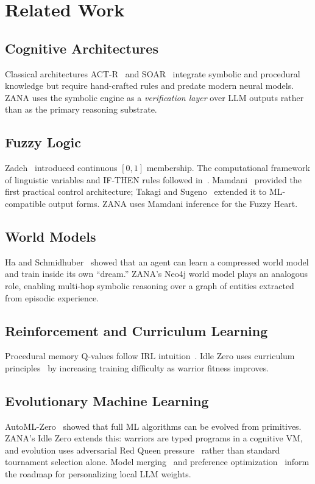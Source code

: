 \documentclass[12pt,a4paper]{article}
\begin{document}
\section{Related Work}

\subsection{Cognitive Architectures}
Classical architectures ACT-R~\cite{anderson2004actr} and SOAR~\cite{laird2012soar} integrate
symbolic and procedural knowledge but require hand-crafted rules and predate modern neural models.
ZANA uses the symbolic engine as a \emph{verification layer} over LLM outputs rather than as the
primary reasoning substrate.

\subsection{Fuzzy Logic}
Zadeh~\cite{zadeh1965fuzzysets} introduced continuous $[0,1]$ membership. The computational framework
of linguistic variables and IF-THEN rules followed in~\cite{zadeh1973outline,zadeh1975fuzzylogic}.
Mamdani~\cite{mamdani1974application} provided the first practical control architecture; Takagi and
Sugeno~\cite{takagi1985fuzzy} extended it to ML-compatible output forms. ZANA uses Mamdani inference
for the Fuzzy Heart.

\subsection{World Models}
Ha and Schmidhuber~\cite{ha2018worldmodels} showed that an agent can learn a compressed world model
and train inside its own ``dream.'' ZANA's Neo4j world model plays an analogous role, enabling
multi-hop symbolic reasoning over a graph of entities extracted from episodic experience.

\subsection{Reinforcement and Curriculum Learning}
Procedural memory Q-values follow IRL intuition~\cite{ng2000irl}. Idle Zero uses curriculum
principles~\cite{bengio2009curriculum} by increasing training difficulty as warrior fitness improves.

\subsection{Evolutionary Machine Learning}
AutoML-Zero~\cite{real2020automlzero} showed that full ML algorithms can be evolved from primitives.
ZANA's Idle Zero extends this: warriors are typed programs in a cognitive VM, and evolution uses
adversarial Red Queen pressure~\cite{kumar2025redqueen} rather than standard tournament selection alone.
Model merging~\cite{akiba2024modelmerging} and preference optimization~\cite{lu2024preferenceoptalgo}
inform the roadmap for personalizing local LLM weights.
\end{document}
